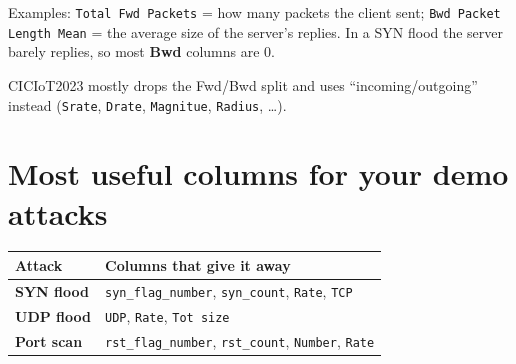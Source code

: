 \documentclass[11pt]{article}
\begin{document}
Examples: \texttt{Total Fwd Packets} = how many packets the client sent;
\texttt{Bwd Packet Length Mean} = the average size of the server's replies.
In a SYN flood the server barely replies, so most \textbf{Bwd} columns are 0.

CICIoT2023 mostly drops the Fwd/Bwd split and uses ``incoming/outgoing'' instead (\texttt{Srate}, \texttt{Drate}, \texttt{Magnitue}, \texttt{Radius}, \dots).

\section*{Most useful columns for your demo attacks}

\begin{tabularx}{\textwidth}{@{}>{\bfseries}l X@{}}
\toprule
Attack & Columns that give it away \\
\midrule
SYN flood & \texttt{syn\_flag\_number}, \texttt{syn\_count}, \texttt{Rate}, \texttt{TCP} \\
UDP flood & \texttt{UDP}, \texttt{Rate}, \texttt{Tot size} \\
Port scan & \texttt{rst\_flag\_number}, \texttt{rst\_count}, \texttt{Number}, \texttt{Rate} \\
\bottomrule
\end{tabularx}
\end{document}
